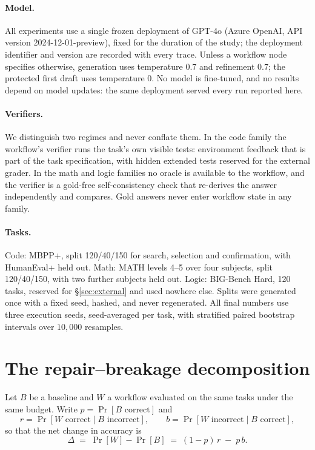 \documentclass{article}
\newcommand{\rrate}{r}
\newcommand{\brate}{b}
\begin{document}
\paragraph{Model.} All experiments use a single frozen deployment of GPT-4o
(Azure OpenAI, API version 2024-12-01-preview), fixed for the duration of the
study; the deployment identifier and version are recorded with every trace.
Unless a workflow node specifies otherwise, generation uses temperature $0.7$
and refinement $0.7$; the protected first draft uses temperature $0$. No model
is fine-tuned, and no results depend on model updates: the same deployment
served every run reported here.

\paragraph{Verifiers.} We distinguish two regimes and never conflate them. In
the code family the workflow's verifier runs the task's own visible tests:
environment feedback that is part of the task specification, with hidden
extended tests reserved for the external grader. In the math and logic families
no oracle is available to the workflow, and the verifier is a gold-free
self-consistency check that re-derives the answer independently and compares.
Gold answers never enter workflow state in any family.

\paragraph{Tasks.} Code: MBPP+, split 120/40/150 for search, selection and
confirmation, with HumanEval+ held out. Math: MATH levels 4--5 over four
subjects, split 120/40/150, with two further subjects held out. Logic:
BIG-Bench Hard, 120 tasks, reserved for \S\ref{sec:external} and used nowhere
else. Splits were generated once with a fixed seed, hashed, and never
regenerated. All final numbers use three execution seeds, seed-averaged per
task, with stratified paired bootstrap intervals over $10{,}000$ resamples.

\section{The repair--breakage decomposition}
\label{sec:theory}

Let $B$ be a baseline and $W$ a workflow evaluated on the same tasks under the
same budget. Write $p=\Pr[B\text{ correct}]$ and
\begin{equation}
\rrate = \Pr[W \text{ correct} \mid B \text{ incorrect}], \qquad
\brate = \Pr[W \text{ incorrect} \mid B \text{ correct}],
\end{equation}
so that the net change in accuracy is
\begin{equation}
\Delta \;=\; \Pr[W] - \Pr[B] \;=\; (1-p)\,\rrate \;-\; p\,\brate.
\label{eq:identity}
\end{equation}
\end{document}
